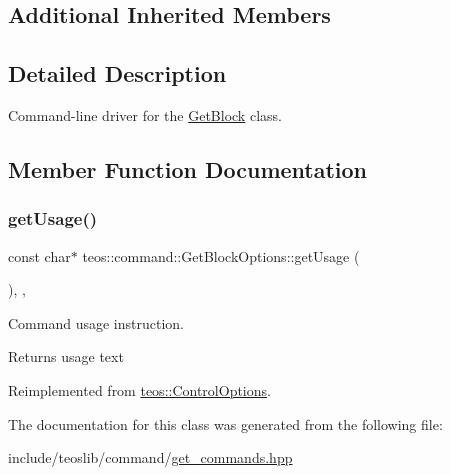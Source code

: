 \subsection*{Additional Inherited Members}


\subsection{Detailed Description}
Command-\/line driver for the \mbox{\hyperlink{classteos_1_1command_1_1_get_block}{Get\+Block}} class. 

\subsection{Member Function Documentation}
\mbox{\label{classteos_1_1command_1_1_get_block_options_a85970d4f6337e594d2ac0756f67c50f7}} 
\subsubsection{\texorpdfstring{get\+Usage()}{getUsage()}}
{\footnotesize\ttfamily const char$\ast$ teos\+::command\+::\+Get\+Block\+Options\+::get\+Usage (\begin{DoxyParamCaption}{ }\end{DoxyParamCaption})\hspace{0.3cm}{\ttfamily [inline]}, {\ttfamily [protected]}, {\ttfamily [virtual]}}



Command \textquotesingle{}usage\textquotesingle{} instruction. 

\begin{DoxyReturn}{Returns}
usage text 
\end{DoxyReturn}


Reimplemented from \mbox{\hyperlink{classteos_1_1_control_options_a0aa5671f9bc750ed5280c26c543874f3}{teos\+::\+Control\+Options}}.



The documentation for this class was generated from the following file\+:\begin{DoxyCompactItemize}
\item 
include/teoslib/command/\mbox{\hyperlink{get__commands_8hpp}{get\+\_\+commands.\+hpp}}\end{DoxyCompactItemize}
